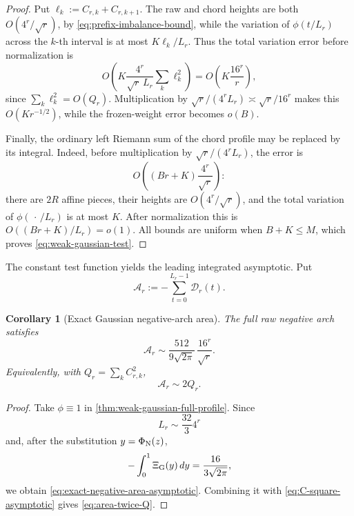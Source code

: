 \documentclass[11pt]{article}
\newtheorem{corollary}[theorem]{Corollary}
\theoremstyle{definition}
\theoremstyle{remark}
\begin{document}
\begin{proof}
Put \(\ell_k:=C_{r,k}+C_{r,k+1}\).  The raw and chord heights are both
\(O(4^r/\sqrt r)\), by \eqref{eq:prefix-imbalance-bound}, while the
variation of \(\phi(t/L_r)\) across the \(k\)-th interval is at most
\(K\ell_k/L_r\).  Thus the total variation error before normalization is
\[
 O\!\left(
 K\frac{4^r}{\sqrt r\,L_r}\sum_k\ell_k^2
 \right)
 =O\!\left(K\frac{16^r}{r}\right),
\]
since \(\sum_k\ell_k^2=O(Q_r)\).  Multiplication by
\(\sqrt r/(4^rL_r)\asymp\sqrt r/16^r\) makes this
\(O(Kr^{-1/2})\), while the frozen-weight error becomes \(o(B)\).

Finally, the ordinary left Riemann sum of the chord profile may be replaced
by its integral.  Indeed, before multiplication by
\(\sqrt r/(4^rL_r)\), the error is
\[
 O\!\left((Br+K)\frac{4^r}{\sqrt r}\right):
\]
there are \(2R\) affine pieces, their heights are
\(O(4^r/\sqrt r)\), and the total variation of
\(\phi(\,\cdot\,/L_r)\) is at most \(K\).  After normalization this is
\(O((Br+K)/L_r)=o(1)\).  All bounds are uniform when \(B+K\le M\), which
proves \eqref{eq:weak-gaussian-test}.
\end{proof}

The constant test function yields the leading integrated asymptotic.
Put
\begin{equation}
 \mathcal A_r:=-\sum_{t=0}^{L_r-1}\mathscr D_r(t).
 \label{eq:negative-arch-area-definition}
\end{equation}

\begin{corollary}[Exact Gaussian negative-arch area]
\label{cor:exact-negative-area}
The full raw negative arch satisfies
\begin{equation}
 {
 \mathcal A_r
 \sim
 \frac{512}{9\sqrt{2\pi}}\,
 \frac{16^r}{\sqrt r}.
 }
 \label{eq:exact-negative-area-asymptotic}
\end{equation}
Equivalently, with
\(Q_r=\sum_kC_{r,k}^2\),
\begin{equation}
 {\mathcal A_r\sim2Q_r.}
 \label{eq:area-twice-Q}
\end{equation}
\end{corollary}

\begin{proof}
Take \(\phi\equiv1\) in \cref{thm:weak-gaussian-full-profile}.  Since
\[
 L_r\sim\frac{32}{3}4^r
\]
and, after the substitution \(y=\Phi_{\rm N}(z)\),
\[
 -\int_0^1\Xi_{\rm G}(y)\,dy
 =\frac{16}{3\sqrt{2\pi}},
\]
we obtain \eqref{eq:exact-negative-area-asymptotic}.  Combining it with
\eqref{eq:C-square-asymptotic} gives \eqref{eq:area-twice-Q}.
\end{proof}
\end{document}
